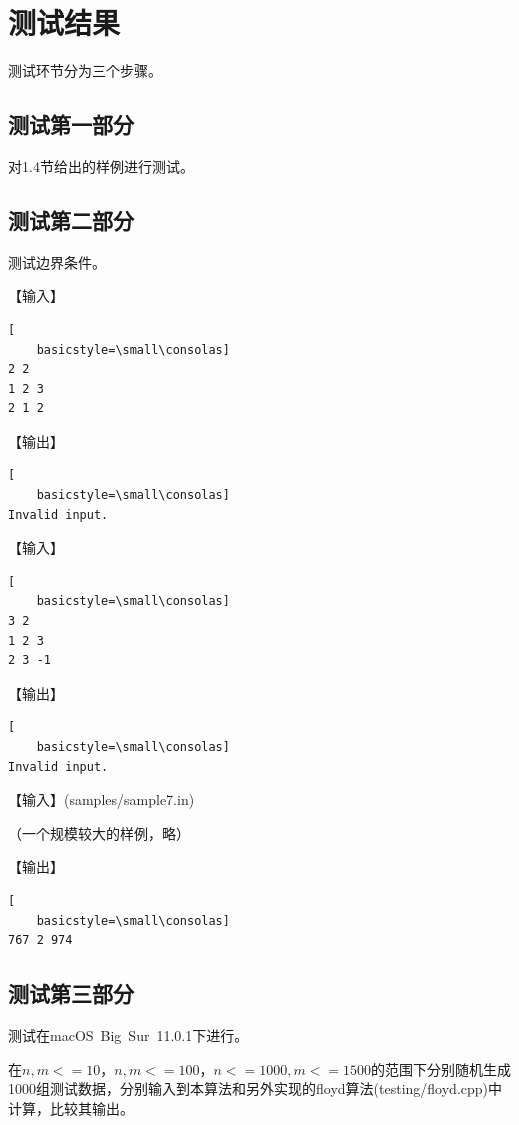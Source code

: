 \documentclass{article}
\begin{document}
\section{测试结果}

测试环节分为三个步骤。

\subsection{测试第一部分}

对1.4节给出的样例进行测试。

\subsection{测试第二部分}

测试边界条件。

【输入】

\begin{lstlisting}[
    basicstyle=\small\consolas]
2 2
1 2 3
2 1 2
\end{lstlisting}

【输出】

\begin{lstlisting}[
    basicstyle=\small\consolas]
Invalid input.
\end{lstlisting}

【输入】

\begin{lstlisting}[
    basicstyle=\small\consolas]
3 2
1 2 3
2 3 -1
\end{lstlisting}

【输出】

\begin{lstlisting}[
    basicstyle=\small\consolas]
Invalid input.
\end{lstlisting}

【输入】(samples/sample7.in)

（一个规模较大的样例，略）

【输出】

\begin{lstlisting}[
    basicstyle=\small\consolas]
767 2 974
\end{lstlisting}

\subsection{测试第三部分}

测试在macOS\ Big\ Sur\ 11.0.1下进行。

在$n,m<=10$，$n,m<=100$，$n<=1000,m<=1500$的范围下分别随机生成1000组测试数据，分别输入到本算法和另外实现的floyd算法(testing/floyd.cpp)中计算，比较其输出。
\end{document}
